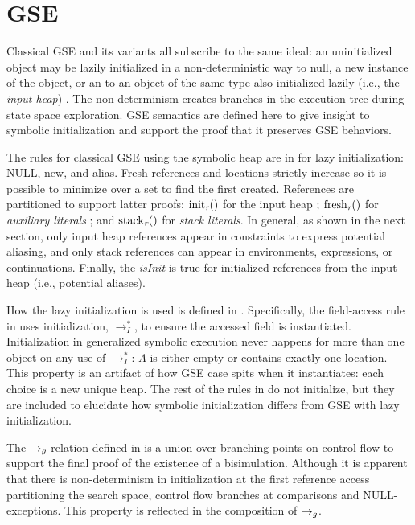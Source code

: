 \section{GSE}
\label{app:gse}
Classical GSE and its variants all subscribe to the same ideal: an uninitialized object may be lazily initialized
in a non-deterministic way to null, a new instance of the object, or an to
an object of the same type also initialized lazily (i.e., the \emph{input heap}) \cite{GSE03,KiasanKunit,Cadar:2008,Rosner:2015}. The
non-determinism creates branches in the execution
tree during state space exploration. GSE semantics are defined here to give insight to symbolic initialization and support the proof that it preserves GSE behaviors. 

The rules for classical GSE using the symbolic heap are in
 for lazy initialization: NULL, new, and alias. Fresh references and locations strictly increase so it is possible to minimize over a set to find the first created. References are partitioned to support latter proofs: $\mathrm{init}_{\emph{r}}()$ for the input
  heap
  ; $\mathrm{fresh}_{\emph{r}}()$ for \emph{auxiliary
  literals}
  ; and $\mathrm{stack}_{\emph{r}}()$ for \emph{stack
    literals}.
  In general, as shown in the next section,
  only input heap references appear in constraints to express potential aliasing, and only stack references can appear in environments, expressions, or continuations.  Finally, the \emph{isInit} is true for initialized references from the input heap (i.e., potential aliases). 

How the lazy
initialization is used is defined in . Specifically,
the field-access rule in  uses initialization,
$\rightarrow_I^*$, to ensure the accessed field is
instantiated. Initialization in generalized symbolic execution never
happens for more than one object on any use of $\rightarrow_I^*$:
$\Lambda$ is either empty or contains exactly one location. This property is an artifact of how GSE case spits when it instantiates: each choice is a new unique heap. The rest of the rules in  do not initialize, but they are included to elucidate how symbolic initialization differs from GSE with lazy initialization. 


The $\rightarrow_{g}$ relation defined in  is a union over branching points on control flow
to support the final proof of the existence of a
bisimulation. Although it is apparent that there is non-determinism in
initialization at the first reference access partitioning the search space, control flow branches at comparisons and NULL-exceptions. This property is reflected in the composition of $\rightarrow_{g}$.



